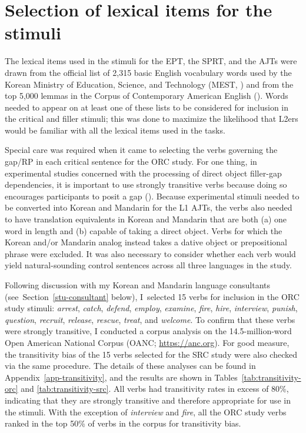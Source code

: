 \section{Selection of lexical items for the stimuli}\label{stu-stimuli}

The lexical items used in the stimuli for the EPT, the SPRT, and the AJTs were drawn from the official list of 2,315 basic English vocabulary words used by the Korean Ministry of Education, Science, and Technology (MEST, \citeyear{ministryofeducationscienceandtechnology2008}) and from the top 5,000 lemmas in the Corpus of Contemporary American English (\cite{davies2010}). Words needed to appear on at least one of these lists to be considered for inclusion in the critical and filler stimuli; this was done to maximize the likelihood that L2ers would be familiar with all the lexical items used in the tasks.

Special care was required when it came to selecting the verbs governing the gap/RP in each critical sentence for the ORC study. For one thing, in experimental studies concerned with the processing of direct object filler-gap dependencies, it is important to use strongly transitive verbs because doing so encourages participants to posit a gap (\cite{omaki.schulz2011}). Because experimental stimuli needed to be converted into Korean and Mandarin for the L1 AJTs, the verbs also needed to have translation equivalents in Korean and Mandarin that are both (a) one word in length and (b) capable of taking a direct object. Verbs for which the Korean and/or Mandarin analog instead takes a dative object or prepositional phrase were excluded. It was also necessary to consider whether each verb would yield natural-sounding control sentences across all three languages in the study.

Following discussion with my Korean and Mandarin language consultants (see~Section~\ref{stu-consultant} below), I~selected 15 verbs for inclusion in the ORC study stimuli: \textit{arrest}, \textit{catch}, \textit{defend}, \textit{employ}, \textit{examine}, \textit{fire}, \textit{hire}, \textit{interview}, \textit{punish}, \textit{question}, \textit{recruit}, \textit{release}, \textit{rescue}, \textit{treat}, and \textit{welcome}. To confirm that these verbs were strongly transitive, I conducted a corpus analysis on the 14.5-million-word Open American National Corpus (OANC; \url{https://anc.org}). For good measure, the transitivity bias of the 15 verbs selected for the SRC study were also checked via the same procedure. The details of these analyses can be found in Appendix~\ref{app-transitivity}, and the results are shown in Tables~\ref{tab:transitivity-orc} and \ref{tab:transitivity-src}. All verbs had transitivity rates in excess of 80\%, indicating that they are strongly transitive and therefore appropriate for use in the stimuli. With the exception of \textit{interview} and \textit{fire}, all the ORC study verbs ranked in the top 50\% of verbs in the corpus for transitivity bias.

